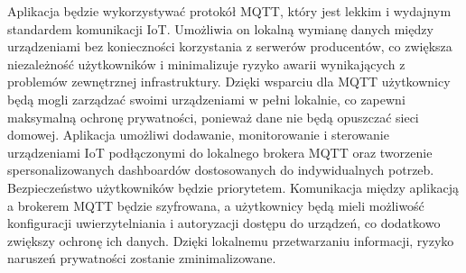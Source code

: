Aplikacja będzie wykorzystywać protokół MQTT, który jest lekkim i wydajnym standardem komunikacji IoT. Umożliwia on lokalną wymianę danych między urządzeniami bez konieczności korzystania z serwerów producentów, co zwiększa niezależność użytkowników i minimalizuje ryzyko awarii wynikających z problemów zewnętrznej infrastruktury. Dzięki wsparciu dla MQTT użytkownicy będą mogli zarządzać swoimi urządzeniami w pełni lokalnie, co zapewni maksymalną ochronę prywatności, ponieważ dane nie będą opuszczać sieci domowej. Aplikacja umożliwi dodawanie, monitorowanie i sterowanie urządzeniami IoT podłączonymi do lokalnego brokera MQTT oraz tworzenie spersonalizowanych dashboardów dostosowanych do indywidualnych potrzeb.\\

Bezpieczeństwo użytkowników będzie priorytetem. Komunikacja między aplikacją a brokerem MQTT będzie szyfrowana, a użytkownicy będą mieli możliwość konfiguracji uwierzytelniania i autoryzacji dostępu do urządzeń, co dodatkowo zwiększy ochronę ich danych. Dzięki lokalnemu przetwarzaniu informacji, ryzyko naruszeń prywatności zostanie zminimalizowane.